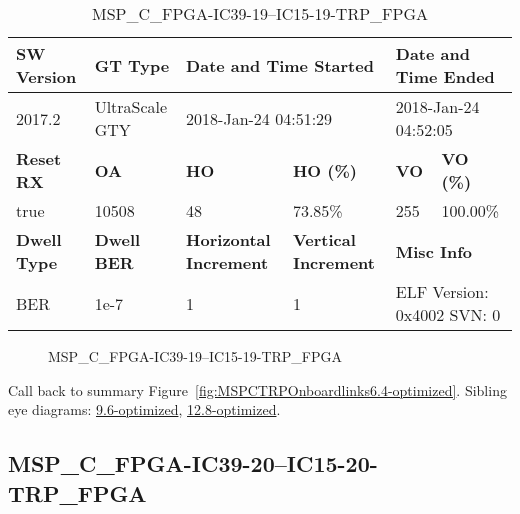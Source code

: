 \begin{table}[h]
\centering
\caption{MSP\_C\_FPGA-IC39-19--IC15-19-TRP\_FPGA}
\label{tab:MSPCFPGAIC3919IC1519TRPFPGA6.4-optimized}
\begin{tabular}{@{}|l|l|l|l|l|l|@{}}
\toprule
\textbf{SW Version}                & \textbf{GT Type}   & \multicolumn{2}{l|}{\textbf{Date and Time Started}}            & \multicolumn{2}{l|}{\textbf{Date and Time Ended}}        \\ \midrule
2017.2                       & UltraScale GTY          & \multicolumn{2}{l|}{2018-Jan-24 04:51:29}                   & \multicolumn{2}{l|}{2018-Jan-24 04:52:05}               \\ \midrule
\textbf{Reset RX}                  & \textbf{OA} & \textbf{HO}   & \textbf{HO (\%)} & \textbf{VO} & \textbf{VO (\%)} \\ \midrule
true & 10508        & 48          & 73.85\%        & 255        & 100.00\%       \\ \midrule
\textbf{Dwell Type}                & \textbf{Dwell BER} & \textbf{Horizontal Increment} & \textbf{Vertical Increment}    & \multicolumn{2}{l|}{\textbf{Misc Info}}                  \\ \midrule
BER                            & 1e-7        & 1        & 1           & \multicolumn{2}{l|}{ELF Version: 0x4002 SVN: 0}                         \\ \bottomrule
\end{tabular}
\end{table}

\begin{figure}[h]
\caption{MSP\_C\_FPGA-IC39-19--IC15-19-TRP\_FPGA} \label{fig:MSPCFPGAIC3919IC1519TRPFPGA6.4-optimized}
\end{figure}

Call back to summary Figure~\ref{fig:MSPCTRPOnboardlinks6.4-optimized}.
Sibling eye diagrams: \hyperref[sec:MSPCFPGAIC3919IC1519TRPFPGA9.6-optimized]{9.6-optimized}, \hyperref[sec:MSPCFPGAIC3919IC1519TRPFPGA12.8-optimized]{12.8-optimized}.

\clearpage
\newpage


\subsection{MSP\_C\_FPGA-IC39-20--IC15-20-TRP\_FPGA}\label{sec:MSPCFPGAIC3920IC1520TRPFPGA6.4-optimized}

